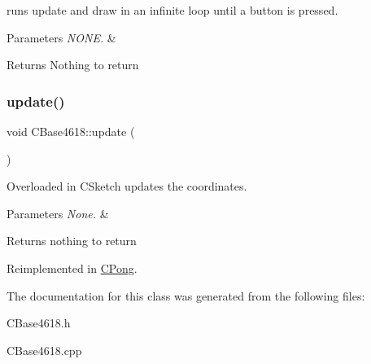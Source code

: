 runs update and draw in an infinite loop until a button is pressed. 


\begin{DoxyParams}{Parameters}
{\em N\+O\+N\+E.} & \\
\hline
\end{DoxyParams}
\begin{DoxyReturn}{Returns}
Nothing to return 
\end{DoxyReturn}
\hypertarget{class_c_base4618_ae1ac81eaa56ded6600262c361f723cb8}{}\label{class_c_base4618_ae1ac81eaa56ded6600262c361f723cb8} 
\subsubsection{\texorpdfstring{update()}{update()}}
{\footnotesize\ttfamily void C\+Base4618\+::update (\begin{DoxyParamCaption}{ }\end{DoxyParamCaption})\hspace{0.3cm}{\ttfamily [virtual]}}



Overloaded in C\+Sketch updates the coordinates. 


\begin{DoxyParams}{Parameters}
{\em None.} & \\
\hline
\end{DoxyParams}
\begin{DoxyReturn}{Returns}
nothing to return 
\end{DoxyReturn}


Reimplemented in \hyperlink{class_c_pong_a819c9942552ff12a11be284a89e3ab12}{C\+Pong}.



The documentation for this class was generated from the following files\+:\begin{DoxyCompactItemize}
\item 
C\+Base4618.\+h\item 
C\+Base4618.\+cpp\end{DoxyCompactItemize}
